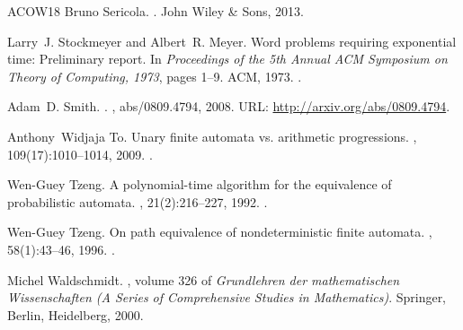 \documentclass[10pt,a4paper]{amsart}
\numberwithin{equation}{section}
\theoremstyle{plain}
\theoremstyle{definition}
\theoremstyle{remark}
\begin{document}
\begin{thebibliography}{ACOW18}
Bruno Sericola.
.
\newblock John Wiley \& Sons, 2013.

Larry~J. Stockmeyer and Albert~R. Meyer.
\newblock Word problems requiring exponential time: Preliminary report.
\newblock In {\em Proceedings of the 5th Annual {ACM} Symposium on Theory of
  Computing, 1973}, pages 1--9. {ACM}, 1973.
\newblock \href {https://doi.org/10.1145/800125.804029}
  {}.

Adam~D. Smith.
.
, abs/0809.4794, 2008.
\newblock URL: \url{http://arxiv.org/abs/0809.4794}.

Anthony~Widjaja To.
\newblock Unary finite automata vs. arithmetic progressions.
, 109(17):1010--1014, 2009.
\newblock \href {https://doi.org/10.1016/j.ipl.2009.06.005}
  {}.

Wen{-}Guey Tzeng.
\newblock A polynomial-time algorithm for the equivalence of probabilistic
  automata.
, 21(2):216--227, 1992.
\newblock \href {https://doi.org/10.1137/0221017} {}.

Wen{-}Guey Tzeng.
\newblock On path equivalence of nondeterministic finite automata.
, 58(1):43--46, 1996.
\newblock \href {https://doi.org/10.1016/0020-0190(96)00039-7}
  {}.

Michel Waldschmidt.
, volume
  326 of {\em Grundlehren der mathematischen Wissenschaften (A Series of
  Comprehensive Studies in Mathematics)}.
\newblock Springer, Berlin, Heidelberg, 2000.

\end{thebibliography}
\end{document}

